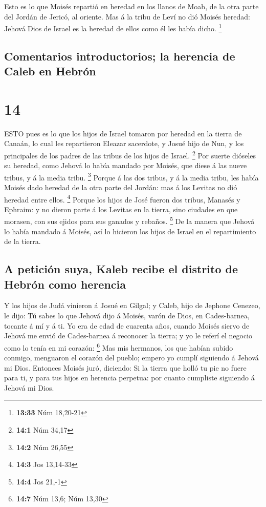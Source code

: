  Esto es lo que Moisés repartió en heredad en los llanos de
Moab, de la otra parte del Jordán de Jericó, al oriente. 
Mas á la tribu de Leví no dió Moisés heredad: Jehová Dios de Israel es
la heredad de ellos como él les había dicho. \footnote{\textbf{13:33}
  Núm 18,20-21}

\hypertarget{comentarios-introductorios-la-herencia-de-caleb-en-hebruxf3n}{%
\subsection{Comentarios introductorios; la herencia de Caleb en
Hebrón}\label{comentarios-introductorios-la-herencia-de-caleb-en-hebruxf3n}}

\hypertarget{section-13}{%
\section{14}\label{section-13}}

 ESTO pues es lo que los hijos de Israel tomaron por heredad
en la tierra de Canaán, lo cual les repartieron Eleazar sacerdote, y
Josué hijo de Nun, y los principales de los padres de las tribus de los
hijos de Israel. \footnote{\textbf{14:1} Núm 34,17}  Por
suerte dióseles su heredad, como Jehová lo había mandado por Moisés, que
diese á las nueve tribus, y á la media tribu. \footnote{\textbf{14:2}
  Núm 26,55}  Porque á las dos tribus, y á la media tribu,
les había Moisés dado heredad de la otra parte del Jordán: mas á los
Levitas no dió heredad entre ellos. \footnote{\textbf{14:3} Jos 13,14-33}
 Porque los hijos de José fueron dos tribus, Manasés y
Ephraim: y no dieron parte á los Levitas en la tierra, sino ciudades en
que morasen, con sus ejidos para sus ganados y rebaños. \footnote{\textbf{14:4}
  Jos 21,-1}  De la manera que Jehová lo había mandado á
Moisés, así lo hicieron los hijos de Israel en el repartimiento de la
tierra.

\hypertarget{a-peticiuxf3n-suya-kaleb-recibe-el-distrito-de-hebruxf3n-como-herencia}{%
\subsection{A petición suya, Kaleb recibe el distrito de Hebrón como
herencia}\label{a-peticiuxf3n-suya-kaleb-recibe-el-distrito-de-hebruxf3n-como-herencia}}

 Y los hijos de Judá vinieron á Josué en Gilgal; y Caleb,
hijo de Jephone Cenezeo, le dijo: Tú sabes lo que Jehová dijo á Moisés,
varón de Dios, en Cades-barnea, tocante á mí y á ti.  Yo era
de edad de cuarenta años, cuando Moisés siervo de Jehová me envió de
Cades-barnea á reconocer la tierra; y yo le referí el negocio como lo
tenía en mi corazón: \footnote{\textbf{14:7} Núm 13,6; Núm 13,30}
 Mas mis hermanos, los que habían subido conmigo, menguaron
el corazón del pueblo; empero yo cumplí siguiendo á Jehová mi Dios.
 Entonces Moisés juró, diciendo: Si la tierra que holló tu
pie no fuere para ti, y para tus hijos en herencia perpetua: por cuanto
cumpliste siguiendo á Jehová mi Dios.

